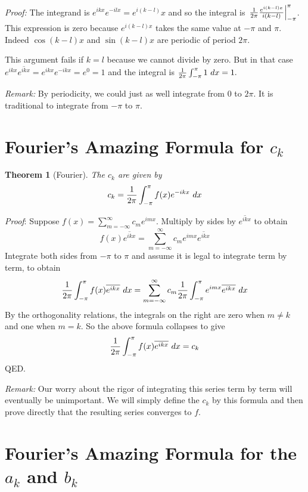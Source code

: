 \documentclass[11pt, oneside]{article}   	%
\newtheorem{theorem}{Theorem}
\begin{document}
{\em Proof:} The integrand is $e^{ikx}e^{-ilx} = e^{i(k -l)}x$ and so  the integral is $\left.{1 \over {2 \pi}} {{e^{i(k -l)x}} \over {i(k -l)}} \right|_{-\pi}^\pi$. This expression is zero because $e^{i(k -l)x}$ takes the same value at $-\pi$ and $\pi$. Indeed $\cos (k - l) x$ and $\sin (k - l)x$ are periodic of period $2 \pi$.

This argument fails if $k = l$ because we cannot divide by zero. But in that case $e^{ikx} \overline{e^{ikx}} = e^{ikx} e^{-ikx} = e^0 = 1$ and the integral is ${1 \over {2 \pi}} \int_{- \pi}^\pi 1 \ dx = 1.$

{\em Remark:} By periodicity, we could just as well integrate from $0$ to $2 \pi$. It is traditional to integrate from $-\pi$ to $\pi$.

\section{Fourier's Amazing Formula for $c_k$}

\begin{theorem}[Fourier]
The $c_k$ are given by
\begin{equation} \label{eq:hello}
c_k = {1 \over {2 \pi}} \int_{- \pi}^\pi f(x) e^{- i k x} \ dx
\end{equation}
\end{theorem}

{\em Proof}: Suppose $f(x) = \sum_{m = - \infty}^\infty c_m e^{imx}$. Multiply by sides by $\overline{e^{i k x}}$ to obtain
\[f(x) \overline{e^{ikx}} = \sum_{m = - \infty}^\infty c_m e^{imx} \overline{e^{ikx}}\]
Integrate both sides from $- \pi$ to $\pi$ and assume it is legal to integrate term by term, to obtain
\[{1 \over {2 \pi}} \int_{- \pi}^\pi f(x) \overline{e^{ikx}} \ dx = \sum_{m = - \infty}^\infty c_m {1 \over {2 \pi}} \int_{- \pi}^\pi e^{i m x} \overline{e^{ikx}}\ dx\]
 By the orthogonality relations, the integrals on the right are zero when $m \ne k$ and one when $m = k$. So the above formula collapses to give
 \[{1 \over {2 \pi}} \int_{- \pi}^\pi f(x) \overline{e^{ikx}} \ dx = c_k\]
 QED.
 
 {\em Remark:} Our worry about the rigor of integrating this series term by term will eventually be unimportant. We will simply define the $c_k$ by this formula and then prove directly that the resulting series converges to $f$.
  
 \section{Fourier's Amazing Formula for the $a_k$ and $b_k$}
 
\end{document}
